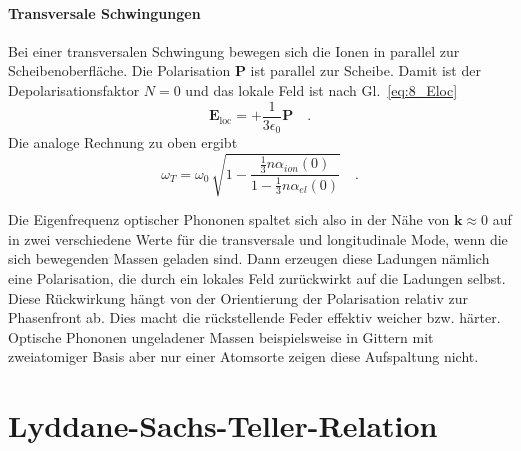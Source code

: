 \paragraph*{Transversale Schwingungen} Bei einer transversalen Schwingung bewegen sich die Ionen in parallel zur  Scheibenoberfläche. Die Polarisation $\bm{P}$ ist parallel zur Scheibe. Damit ist der Depolarisationsfaktor $N=0$ und das lokale Feld ist nach Gl.~\ref{eq:8_Eloc}
\begin{equation}
    \bm{E}_\text{loc}  = + \frac{1}{3\epsilon_0} \bm{P} \quad . \label{eq:8:_Eloc_transversal}
\end{equation}
Die analoge Rechnung zu oben ergibt
\begin{equation}
    \omega_T = \omega_0 \, \sqrt{1 - \frac{\frac{1}{3} n \alpha_{ion}(0)}{1 - \frac{1}{3} n \alpha_{el}(0) }} \quad .
\end{equation}


Die Eigenfrequenz optischer Phononen spaltet sich also in der Nähe von $\bm{k} \approx 0$ auf in zwei verschiedene Werte für die transversale und longitudinale Mode, wenn die sich bewegenden Massen geladen sind. Dann erzeugen diese Ladungen nämlich eine Polarisation, die durch ein lokales Feld zurückwirkt auf die Ladungen selbst. Diese Rückwirkung hängt von der Orientierung der Polarisation relativ zur Phasenfront ab. Dies macht die rückstellende Feder effektiv weicher bzw. härter. Optische Phononen ungeladener Massen beispielsweise in Gittern mit zweiatomiger Basis aber nur einer Atomsorte zeigen diese Aufspaltung nicht.


\section*{Lyddane-Sachs-Teller-Relation}


